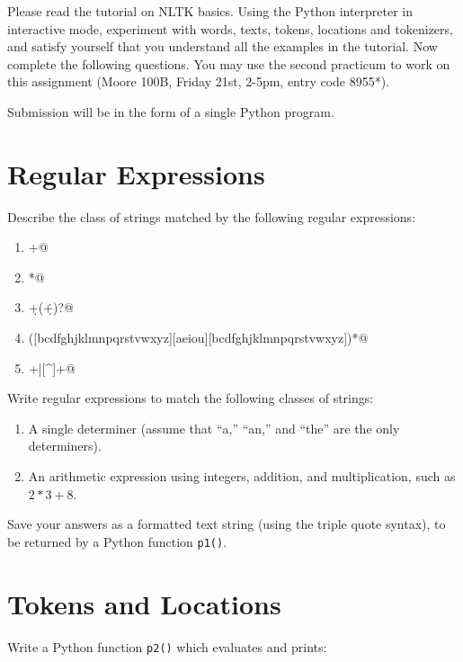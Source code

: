 \documentclass{cis530}
\begin{document}
\maketitle

Please read the tutorial on NLTK basics.
Using the Python interpreter in interactive mode, experiment
with words, texts, tokens, locations and tokenizers, and satisfy
yourself that you understand all the examples in the tutorial.
Now complete the following questions.
You may use the second practicum to work on this assignment
(Moore 100B, Friday 21st, 2-5pm, entry code 8955*).

Submission will be in the form of a single Python program.

\section{Regular Expressions}

Describe the class of strings matched by the following regular expressions:
\begin{enumerate}
    \item \verb@[a-zA-Z]+@
    \item \verb@[A-Z][a-z]*@
    \item \verb@\d+(\.\d+)?@
    \item \verb@([bcdfghjklmnpqrstvwxyz][aeiou][bcdfghjklmnpqrstvwxyz])*@
    \item \verb@\w+|[^\w\s]+@
\end{enumerate}

Write regular expressions to match the following classes of strings:

\begin{enumerate}
    \item A single determiner (assume that ``a,'' ``an,'' and ``the''
    are the only determiners).  
    \item An arithmetic expression using integers, addition, and
    multiplication, such as $2*3+8$.
\end{enumerate}

Save your answers as a formatted text string (using the triple quote
syntax), to be returned by a Python function \texttt{p1()}.

\section{Tokens and Locations}

Write a Python function \texttt{p2()} which evaluates and prints:
\end{document}
